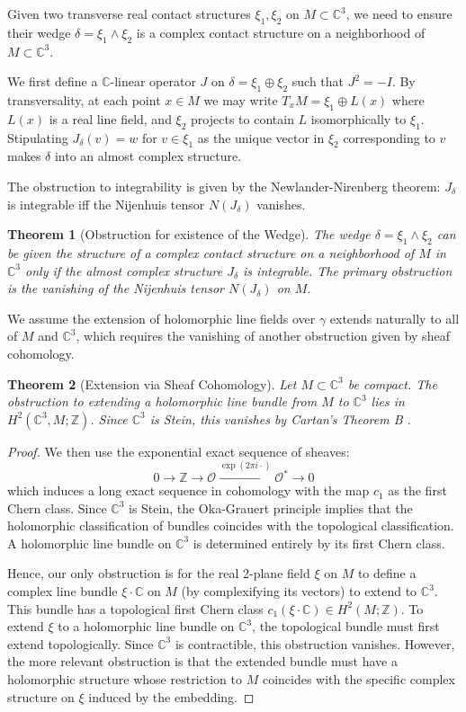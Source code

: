 \documentclass{amsart}
\newtheorem{theorem}{Theorem}
\newcommand{\C}{\mathbb{C}}
\newcommand{\Z}{\mathbb{Z}}
\begin{document}
Given two transverse real contact structures $\xi_1, \xi_2$ on $M \subset \C^3$, we need to ensure their wedge $\delta = \xi_1 \wedge \xi_2$ is a complex contact structure on a neighborhood of $M \subset \C^3$.

We first define a $\C$-linear operator $J$ on $\delta = \xi_1 \oplus \xi_2$ such that $J^2 = -I$. By transversality, at each point $x \in M$ we may write $T_xM = \xi_1 \oplus L(x)$ where $L(x)$ is a real line field, and $\xi_2$ projects to contain $L$ isomorphically to $\xi_1$. Stipulating $J_\delta(v) = w$ for $v \in \xi_1$ as the unique vector in $\xi_2$ corresponding to $v$ makes $\delta$ into an almost complex structure.

The obstruction to integrability is given by the Newlander-Nirenberg theorem: $J_\delta$ is integrable iff the Nijenhuis tensor $N(J_\delta)$ vanishes.

\begin{theorem}[Obstruction for existence of the Wedge]
The wedge $\delta = \xi_1 \wedge \xi_2$ can be given the structure of a complex contact structure on a neighborhood of $M$ in $\C^3$ only if the almost complex structure $J_\delta$ is integrable. The primary obstruction is the vanishing of the Nijenhuis tensor $N(J_\delta)$ on $M$.
\end{theorem}

We assume the extension of holomorphic line fields over $\gamma$ extends naturally to all of $M$ and $\C^3$, which requires the vanishing of another obstruction given by sheaf cohomology.

\begin{theorem}[Extension via Sheaf Cohomology]
Let $M \subset \C^3$ be compact. The obstruction to extending a holomorphic line bundle from $M$ to $\C^3$ lies in $H^2(\C^3, M; \Z)$. Since $\C^3$ is Stein, this vanishes by Cartan's Theorem B \cite{Cartan1953}.
\end{theorem}
\begin{proof}
We then use the exponential exact sequence of sheaves:
\[
0 \to \Z \to \mathcal{O} \xrightarrow{\exp(2\pi i \cdot)} \mathcal{O}^* \to 0
\]
which induces a long exact sequence in cohomology with the map $c_1$ as the first Chern class. Since $\C^3$ is Stein, the Oka-Grauert principle implies that the holomorphic classification of bundles coincides with the topological classification. A holomorphic line bundle on $\C^3$ is determined entirely by its first Chern class.

Hence, our only obstruction is for the real 2-plane field $\xi$ on $M$ to define a complex line bundle $\xi \cdot \C$ on $M$ (by complexifying its vectors) to extend to $\C^3$. This bundle has a topological first Chern class $c_1(\xi \cdot \C) \in H^2(M;\Z)$. To extend $\xi$ to a holomorphic line bundle on $\C^3$, the topological bundle must first extend topologically. Since $\C^3$ is contractible, this obstruction vanishes. However, the more relevant obstruction is that the extended bundle must have a holomorphic structure whose restriction to $M$ coincides with the specific complex structure on $\xi$ induced by the embedding.
\end{proof}
\end{document}
